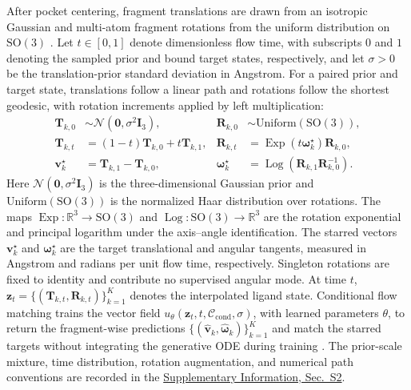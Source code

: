 \documentclass{article}
\renewcommand{\boldsymbol}[1]{\pmb{#1}}
\newcommand{\R}{\mathbb{R}}
\newcommand{\SO}{\mathrm{SO}}
\newcommand{\citep}[1]{\cite{#1}}
\newcommand{\sisection}[1]{\href{SI.pdf}{Supplementary Information, Sec.~#1}}
\begin{document}
After pocket centering, fragment translations are drawn from an isotropic Gaussian and multi-atom fragment rotations from the uniform distribution on \(\SO(3)\) \citep{shoemake1992uniform}.
Let \(t\in[0,1]\) denote dimensionless flow time, with subscripts \(0\) and \(1\) denoting the sampled prior and bound target states, respectively, and let \(\sigma>0\) be the translation-prior standard deviation in Angstrom.
For a paired prior and target state, translations follow a linear path and rotations follow the shortest geodesic, with rotation increments applied by left multiplication:
\begin{align}
    \mathbf{T}_{k,0}
    &\sim\mathcal{N}(\mathbf{0},\sigma^2\mathbf{I}_3),
    &
    \mathbf{R}_{k,0}
    &\sim\mathrm{Uniform}(\SO(3)),
    \nonumber\\
    \mathbf{T}_{k,t}
    &=(1-t)\mathbf{T}_{k,0}+t\mathbf{T}_{k,1},
    &
    \mathbf{R}_{k,t}
    &=\operatorname{Exp}(t\boldsymbol{\omega}^{\star}_k)\mathbf{R}_{k,0},
    \nonumber\\
    \mathbf{v}^{\star}_k
    &=\mathbf{T}_{k,1}-\mathbf{T}_{k,0},
    &
    \boldsymbol{\omega}^{\star}_k
    &=\operatorname{Log}(\mathbf{R}_{k,1}\mathbf{R}_{k,0}^{-1}).
    \label{eq:flow_path}
\end{align}
Here \(\mathcal{N}(\mathbf{0},\sigma^2\mathbf{I}_3)\) is the three-dimensional Gaussian prior and \(\mathrm{Uniform}(\SO(3))\) is the normalized Haar distribution over rotations.
The maps \(\operatorname{Exp}:\R^3\rightarrow\SO(3)\) and \(\operatorname{Log}:\SO(3)\rightarrow\R^3\) are the rotation exponential and principal logarithm under the axis--angle identification.
The starred vectors \(\mathbf{v}^{\star}_k\) and \(\boldsymbol{\omega}^{\star}_k\) are the target translational and angular tangents, measured in Angstrom and radians per unit flow time, respectively.
Singleton rotations are fixed to identity and contribute no supervised angular mode.
At time \(t\), \(\mathbf{z}_t=\{(\mathbf{T}_{k,t},\mathbf{R}_{k,t})\}_{k=1}^{K}\) denotes the interpolated ligand state.
Conditional flow matching trains the vector field \(u_{\theta}(\mathbf{z}_t,t,\mathcal{C}_{\mathrm{cond}},\sigma)\), with learned parameters \(\theta\), to return the fragment-wise predictions \(\{(\widehat{\mathbf{v}}_k,\widehat{\boldsymbol{\omega}}_k)\}_{k=1}^{K}\) and match the starred targets without integrating the generative ODE during training \citep{lipman2023flow}.
The prior-scale mixture, time distribution, rotation augmentation, and numerical path conventions are recorded in the \sisection{S2}.
\end{document}
